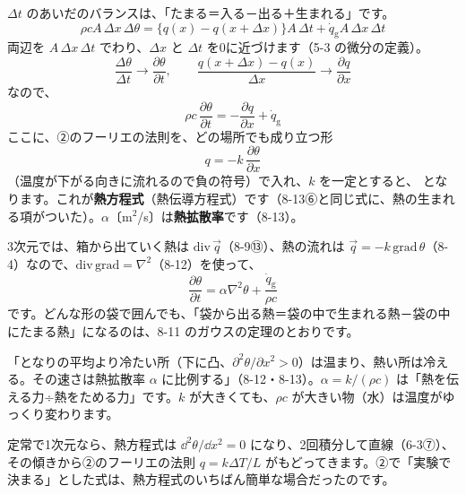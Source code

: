\noindent $\Delta t$ のあいだのバランスは、「たまる＝入る－出る＋生まれる」です。
\[\rho cA\,\Delta x\,\Delta\theta=\bigl\{q(x)-q(x+\Delta x)\bigr\}A\,\Delta t+\dot q_{\mathrm g}A\,\Delta x\,\Delta t\]
両辺を $A\,\Delta x\,\Delta t$ でわり、$\Delta x$ と $\Delta t$ を0に近づけます（5-3 の微分の定義）。
\[\frac{\Delta\theta}{\Delta t}\to\frac{\partial\theta}{\partial t},\qquad\frac{q(x+\Delta x)-q(x)}{\Delta x}\to\frac{\partial q}{\partial x}\]
なので、
\[\rho c\,\frac{\partial\theta}{\partial t}=-\frac{\partial q}{\partial x}+\dot q_{\mathrm g}\]
ここに、②のフーリエの法則を、どの場所でも成り立つ形
\[q=-k\,\frac{\partial\theta}{\partial x}\]
（温度が下がる向きに流れるので負の符号）で入れ、$k$ を一定とすると、
となります。これが\textbf{熱方程式}（熱伝導方程式）です（8-13⑥と同じ式に、熱の生まれる項がついた）。$\alpha$〔m$^2$/s〕は\textbf{熱拡散率}です（8-13）。

3次元では、箱から出ていく熱は $\mathrm{div}\,\vec q$（8-9⑬）、熱の流れは $\vec q=-k\,\mathrm{grad}\,\theta$（8-4）なので、$\mathrm{div}\,\mathrm{grad}=\nabla^2$（8-12）を使って、
\[\frac{\partial\theta}{\partial t}=\alpha\nabla^2\theta+\frac{\dot q_{\mathrm g}}{\rho c}\]
です。どんな形の袋で囲んでも、「袋から出る熱＝袋の中で生まれる熱－袋の中にたまる熱」になるのは、8-11 のガウスの定理のとおりです。

\begin{phyomi}[$\dfrac{\partial\theta}{\partial t}=\alpha\dfrac{\partial^2\theta}{\partial x^2}$]
「となりの平均より冷たい所（下に凸、$\partial^2\theta/\partial x^2>0$）は温まり、熱い所は冷える。その速さは熱拡散率 $\alpha$ に比例する」（8-12・8-13）。$\alpha=k/(\rho c)$ は「熱を伝える力÷熱をためる力」です。$k$ が大きくても、$\rho c$ が大きい物（水）は温度がゆっくり変わります。
\end{phyomi}

\begin{phflow}[熱方程式]
\end{phflow}
定常で1次元なら、熱方程式は $\dd^2\theta/\dd x^2=0$ になり、2回積分して直線（6-3⑦）、その傾きから②のフーリエの法則 $q=k\Delta T/L$ がもどってきます。②で「実験で決まる」とした式は、熱方程式のいちばん簡単な場合だったのです。

